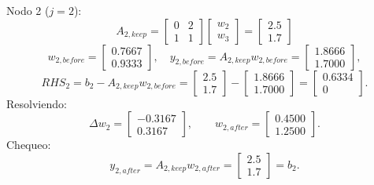 \documentclass[11pt,a4paper]{article}
\begin{document}
Nodo 2 ($j=2$):
\[
A_{2,keep}=
\begin{bmatrix}
0&2\\
1&1
\end{bmatrix}
\begin{bmatrix}
w_2\\w_3
\end{bmatrix}
=
\begin{bmatrix}
2.5\\1.7
\end{bmatrix}
\]
\[
w_{2,before}=
\begin{bmatrix}
0.7667\\0.9333
\end{bmatrix},
\quad
y_{2,before}=A_{2,keep}w_{2,before}=
\begin{bmatrix}
1.8666\\1.7000
\end{bmatrix},
\]
\[
RHS_2=b_2-A_{2,keep}w_{2,before}
=
\begin{bmatrix}
2.5\\1.7
\end{bmatrix}
-
\begin{bmatrix}
1.8666\\1.7000
\end{bmatrix}
=
\begin{bmatrix}
0.6334\\0
\end{bmatrix}.
\]
Resolviendo:
\[
\Delta w_2=
\begin{bmatrix}
-0.3167\\0.3167
\end{bmatrix},
\qquad
w_{2,after}=
\begin{bmatrix}
0.4500\\1.2500
\end{bmatrix}.
\]
Chequeo:
\[
y_{2,after}=A_{2,keep}w_{2,after}
=
\begin{bmatrix}
2.5\\1.7
\end{bmatrix}
=b_2.
\]
\end{document}
